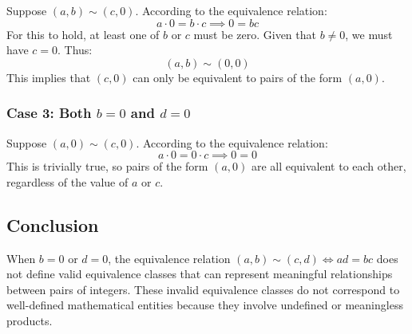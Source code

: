 Suppose \((a, b) \sim (c, 0)\). According to the equivalence relation:
\[
a \cdot 0 = b \cdot c \implies 0 = bc
\]
For this to hold, at least one of \(b\) or \(c\) must be zero. Given that \(b \neq 0\), we must have \(c = 0\). Thus:
\[
(a, b) \sim (0, 0)
\]
This implies that \((c, 0)\) can only be equivalent to pairs of the form \((a, 0)\).

\subsubsection*{Case 3: Both \( b = 0 \) and \( d = 0 \)}

Suppose \((a, 0) \sim (c, 0)\). According to the equivalence relation:
\[
a \cdot 0 = 0 \cdot c \implies 0 = 0
\]
This is trivially true, so pairs of the form \((a, 0)\) are all equivalent to each other, regardless of the value of \(a\) or \(c\).

\subsection*{Conclusion}

When \( b = 0 \) or \( d = 0 \), the equivalence relation \((a, b) \sim (c, d) \iff ad = bc\) does not define valid equivalence classes that can represent meaningful relationships between pairs of integers. These invalid equivalence classes do not correspond to well-defined mathematical entities because they involve undefined or meaningless products.
